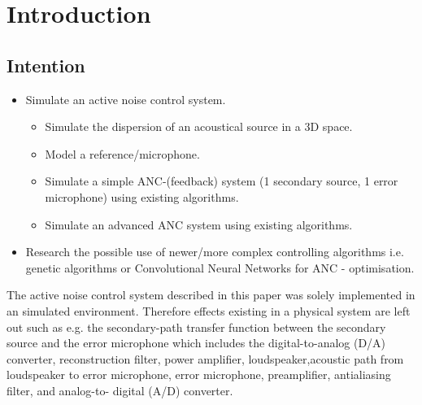 \chapter{Introduction}
\label{chap:introduction}


\section{Intention}
    \begin{itemize}
        \item Simulate an active noise control system. 
    \begin{itemize}
        \item Simulate the dispersion of an acoustical source in a 3D space.
        \item Model a reference/microphone.
        \item Simulate a simple ANC-(feedback) system (1 secondary source, 1 error microphone) using existing algorithms.
        \item Simulate an advanced ANC system using existing algorithms.
    \end{itemize}
        \item Research the possible use of newer/more complex controlling algorithms i.e. genetic algorithms or Convolutional Neural Networks for ANC - optimisation.
\end{itemize}


The active noise control system described in this paper was solely implemented in an simulated environment. Therefore effects existing in a physical system are left out such as e.g. the secondary-path transfer function between the secondary source and the error microphone which includes the digital-to-analog (D/A) converter, reconstruction filter, power amplifier, loudspeaker,acoustic path from loudspeaker to error microphone, error microphone, preamplifier, antialiasing filter, and analog-to- digital (A/D) converter.\cite{Glentis1999}



